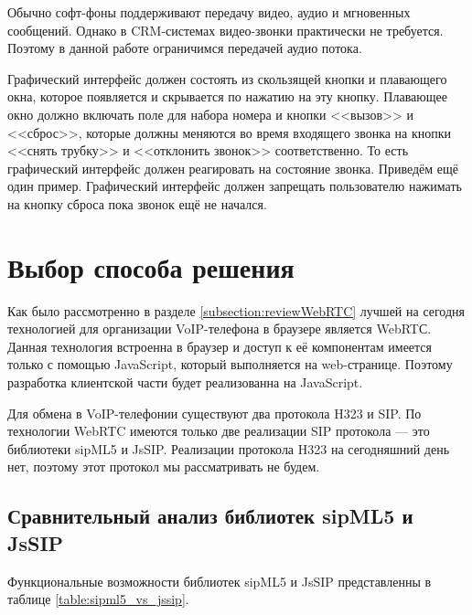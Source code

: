 Обычно софт-фоны поддерживают передачу видео, аудио и мгновенных сообщений. Однако в CRM-системах видео-звонки практически не требуется. Поэтому в данной работе ограничимся передачей аудио потока.

Графический интерфейс должен состоять из скользящей кнопки и плавающего окна, которое появляется и скрывается по нажатию на эту кнопку. Плавающее окно должно включать поле для набора номера и кнопки <<вызов>> и <<сброс>>, которые должны меняются во время входящего звонка на кнопки <<снять трубку>> и <<отклонить звонок>> соответственно. То есть графический интерфейс должен реагировать на состояние звонка. Приведём ещё один пример. Графический интерфейс должен запрещать пользователю нажимать на кнопку сброса пока звонок ещё не начался.

\section{Выбор способа решения}

Как было рассмотренно в разделе \ref{subsection:reviewWebRTC} лучшей на сегодня технологией для организации VoIP-телефона в браузере является WebRTС. Данная технология встроенна в браузер и доступ к её компонентам имеется только с помощью JavaScript, который выполняется на web-странице. Поэтому разработка клиентской части будет реализованна на JavaScript.

Для обмена в VoIP-телефонии существуют два протокола H323 и SIP. По технологии WebRTC имеются только две реализации SIP протокола --- это библиотеки sipML5 и JsSIP. Реализации протокола H323 на сегодняшний день нет, поэтому этот протокол мы рассматривать не будем.

\subsection{Сравнительный анализ библиотек sipML5 и JsSIP}

Функциональные возможности библиотек sipML5 и JsSIP представленны в таблице \ref{table:sipml5_vs_jssip}.\cite{sipML5}\cite{JsSIP}

